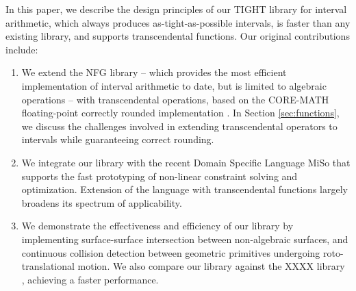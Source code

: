 In this paper, we describe the design principles of our TIGHT library for interval arithmetic, which always produces as-tight-as-possible intervals, is faster than any existing library, and supports transcendental functions.
%
Our original contributions include:
\begin{enumerate}
\item We extend the NFG library \cite{nfg} -- which provides the most efficient implementation of interval arithmetic to date, but is limited to algebraic operations -- with transcendental operations, based on the CORE-MATH floating-point correctly rounded implementation \cite{Sibidanov2022}.
In Section \ref{sec:functions}, we discuss the challenges involved in extending transcendental operators to intervals while guaranteeing correct rounding. 
\item We integrate our library with the recent Domain Specific Language MiSo \cite{Sichetti2025} that supports the fast prototyping of non-linear constraint solving and optimization. 
Extension of the language with transcendental functions largely broadens its spectrum of applicability. 
\item We demonstrate the effectiveness and efficiency of our library by implementing surface-surface intersection between non-algebraic surfaces, and continuous collision detection between geometric primitives undergoing roto-translational motion.  We also compare our library against the XXXX library \cite{something}, achieving a faster performance.
\end{enumerate}




